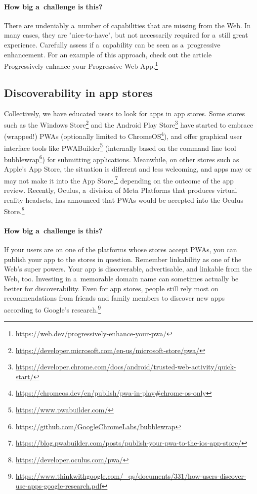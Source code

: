 \documentclass[sigconf]{acmart}
\begin{document}
\paragraph{How big a~challenge is this?}

There are undeniably a~number of capabilities that are missing from the Web. In many cases, they are "nice-to-have", but not necessarily required for a~still great experience. Carefully assess if a~capability can be seen as a~progressive enhancement. For an example of this approach, check out the article Progressively enhance your Progressive Web App.\footnote{\label{footnote:progressively-enhance}\url{https://web.dev/progressively-enhance-your-pwa/}}

\subsection{Discoverability in app stores}

Collectively, we have educated users to look for apps in app stores. Some stores such as the Windows Store\footnote{\url{https://developer.microsoft.com/en-us/microsoft-store/pwa/}} and the Android Play Store\footnote{\url{https://developer.chrome.com/docs/android/trusted-web-activity/quick-start/}} have started to embrace (wrapped!) PWAs (optionally limited to ChromeOS\footnote{\url{https://chromeos.dev/en/publish/pwa-in-play\#chrome-os-only}}), and offer graphical user interface tools like PWABuilder\footnote{\url{https://www.pwabuilder.com/}} (internally based on the command line tool bubblewrap\footnote{\url{https://github.com/GoogleChromeLabs/bubblewrap}}) for submitting applications. Meanwhile, on other stores such as Apple's App Store, the situation is different and less welcoming, and apps may or may not make it into the App Store,\footnote{\url{https://blog.pwabuilder.com/posts/publish-your-pwa-to-the-ios-app-store/}} depending on the outcome of the app review. Recently, Oculus, a~division of Meta Platforms that produces virtual reality headsets, has announced that PWAs would be accepted into the Oculus Store.\footnote{\url{https://developer.oculus.com/pwa/}}

\paragraph{How big a~challenge is this?}

If your users are on one of the platforms whose stores accept PWAs, you can publish your app to the stores in question. Remember linkability as one of the Web's super powers. Your app is discoverable, advertisable, and linkable from the Web, too. Investing in a~memorable domain name can sometimes actually be better for discoverability. Even for app stores, people still rely most on recommendations from friends and family members to discover new apps according to Google's research.\footnote{\url{https://www.thinkwithgoogle.com/_qs/documents/331/how-users-discover-use-apps-google-research.pdf}}
\end{document}
